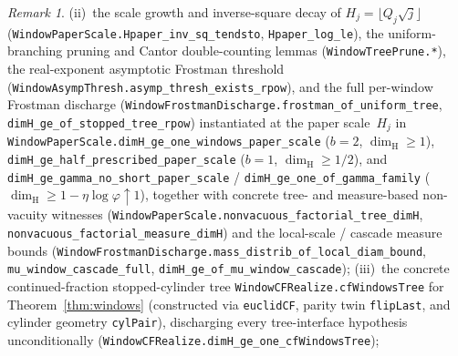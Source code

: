 \documentclass[11pt]{article}
\theoremstyle{definition}
\theoremstyle{remark}
\newtheorem{remark}[theorem]{Remark}
\newcommand{\dimH}{\dim_{\mathrm{H}}}
\begin{document}
\begin{remark}
(ii)~the scale growth and inverse-square decay of $H_j=\lfloor Q_j\sqrt{j}\rfloor$ (\texttt{WindowPaperScale.\allowbreak Hpaper\_\allowbreak inv\_\allowbreak sq\_\allowbreak tendsto}, \texttt{Hpaper\_\allowbreak log\_\allowbreak le}), the uniform-branching pruning and Cantor double-counting lemmas (\texttt{WindowTreePrune.*}), the real-exponent asymptotic Frostman threshold (\texttt{WindowAsympThresh.\allowbreak asymp\_\allowbreak thresh\_\allowbreak exists\_\allowbreak rpow}), and the full per-window Frostman discharge (\texttt{WindowFrostmanDischarge.\allowbreak frostman\_\allowbreak of\_\allowbreak uniform\_\allowbreak tree}, \texttt{dimH\_\allowbreak ge\_\allowbreak of\_\allowbreak stopped\_\allowbreak tree\_\allowbreak rpow}) instantiated at the paper scale~$H_j$ in \texttt{WindowPaperScale.\allowbreak dimH\_\allowbreak ge\_\allowbreak one\_\allowbreak windows\_\allowbreak paper\_\allowbreak scale} ($b=2$, $\dimH\ge 1$), \texttt{dimH\_\allowbreak ge\_\allowbreak half\_\allowbreak prescribed\_\allowbreak paper\_\allowbreak scale} ($b=1$, $\dimH\ge 1/2$), and \texttt{dimH\_\allowbreak ge\_\allowbreak gamma\_\allowbreak no\_\allowbreak short\_\allowbreak paper\_\allowbreak scale} / \texttt{dimH\_\allowbreak ge\_\allowbreak one\_\allowbreak of\_\allowbreak gamma\_\allowbreak family} ($\dimH\ge 1-\eta\log\varphi\uparrow 1$), together with concrete tree- and measure-based non-vacuity witnesses (\texttt{WindowPaperScale.\allowbreak nonvacuous\_\allowbreak factorial\_\allowbreak tree\_\allowbreak dimH}, \texttt{nonvacuous\_\allowbreak factorial\_\allowbreak measure\_\allowbreak dimH}) and the local-scale / cascade measure bounds (\texttt{WindowFrostmanDischarge.\allowbreak mass\_\allowbreak distrib\_\allowbreak of\_\allowbreak local\_\allowbreak diam\_\allowbreak bound}, \texttt{mu\_\allowbreak window\_\allowbreak cascade\_\allowbreak full}, \texttt{dimH\_\allowbreak ge\_\allowbreak of\_\allowbreak mu\_\allowbreak window\_\allowbreak cascade});
(iii)~the concrete continued-fraction stopped-cylinder tree \texttt{WindowCFRealize.\allowbreak cfWindowsTree} for Theorem~\ref{thm:windows} (constructed via \texttt{euclidCF}, parity twin \texttt{flipLast}, and cylinder geometry \texttt{cylPair}), discharging every tree-interface hypothesis unconditionally (\texttt{WindowCFRealize.\allowbreak dimH\_\allowbreak ge\_\allowbreak one\_\allowbreak cfWindowsTree});

\end{remark}
\end{document}
